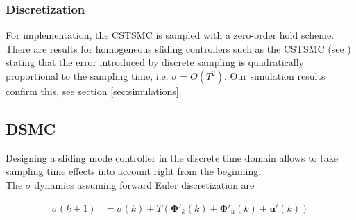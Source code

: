 \documentclass{ifacconf}
\providecommand{\mbf}[1]{\mathbf{#1}}
\newcommand{\idxSample}{{\ensuremath{k}}}
\begin{document}

\subsubsection{Discretization}
For implementation, the CSTSMC is sampled with a zero-order hold scheme. There are results for homogeneous sliding controllers such as the CSTSMC (see \cite{shtessel2014sliding}) stating that the error introduced by discrete sampling is quadratically proportional to the sampling time, i.e. $\sigma = O(T^2)$. Our simulation results confirm this, see section \ref{sec:simulations}.


\subsection{DSMC}
Designing a sliding mode controller in the discrete time domain allows to take sampling time effects into account right from the beginning. \\
The $\sigma$ dynamics assuming forward Euler discretization are

\begin{align}
{{\sigma}}(\idxSample+1)
&=
{{\sigma}}(\idxSample)
+
T(
\mbf{\Phi}'_k(\idxSample) + \mbf{\Phi}'_u(\idxSample) + \mbf{u}'(\idxSample))
\label{eq:sigmadyndiscrete}
\end{align}
\end{document}
